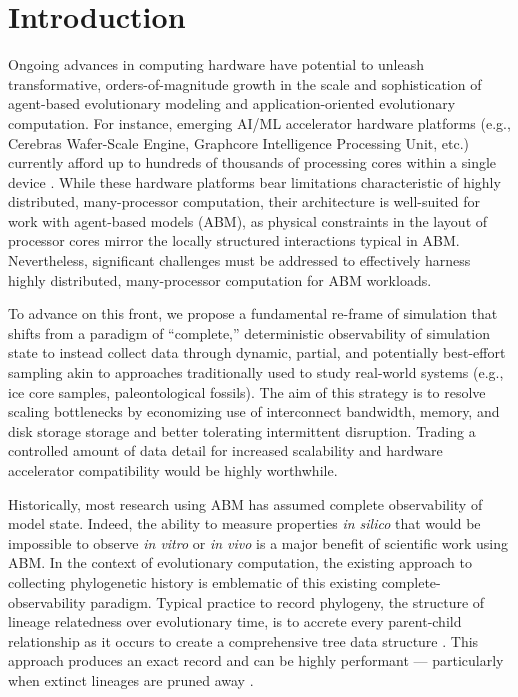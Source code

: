 \section{Introduction} \label{sec:introduction}

Ongoing advances in computing hardware have potential to unleash transformative, orders-of-magnitude growth in the scale and sophistication of agent-based evolutionary modeling and application-oriented evolutionary computation.
For instance, emerging AI/ML accelerator hardware platforms (e.g., Cerebras Wafer-Scale Engine, Graphcore Intelligence Processing Unit, etc.) currently afford up to hundreds of thousands of processing cores within a single device \citep{lauterbach2021path,jia2019dissecting}.
While these hardware platforms bear limitations characteristic of highly distributed, many-processor computation, their architecture is well-suited for work with agent-based models (ABM), as physical constraints in the layout of processor cores mirror the locally structured interactions typical in ABM.
Nevertheless, significant challenges must be addressed to effectively harness highly distributed, many-processor computation for ABM workloads.

To advance on this front, we propose a fundamental re-frame of simulation that shifts from a paradigm of ``complete,'' deterministic observability of simulation state to instead collect data through dynamic, partial, and potentially best-effort sampling akin to approaches traditionally used to study real-world systems (e.g., ice core samples, paleontological fossils).
The aim of this strategy is to resolve scaling bottlenecks by economizing use of interconnect bandwidth, memory, and disk storage storage and better tolerating intermittent disruption.
Trading a controlled amount of data detail for increased scalability and hardware accelerator compatibility would be highly worthwhile.

Historically, most research using ABM has assumed complete observability of model state.
Indeed, the ability to measure properties \textit{in silico} that would be impossible to observe \textit{in vitro} or \textit{in vivo} is a major benefit of scientific work using ABM.
In the context of evolutionary computation, the existing approach to collecting phylogenetic history is emblematic of this existing complete-observability paradigm.
Typical practice to record phylogeny, the structure of lineage relatedness over evolutionary time, is to accrete every parent-child relationship as it occurs to create a comprehensive tree data structure \citep{moreno2024algorithms}.
This approach produces an exact record and can be highly performant --- particularly when extinct lineages are pruned away \citep{dolson2024phylotrackpy}.

